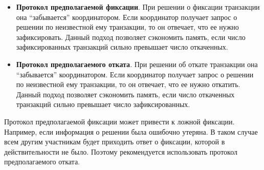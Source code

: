 \begin{itemize}
	\item \textbf{Протокол предполагаемой фиксации}. При решении о фиксации транзакции она
	      ``забывается'' координатором. Если координатор получает запрос о решении по неизвестной ему
	      транзакции, то он отвечает, что ее нужно зафиксировать. Данный подход позволяет сэкономить память,
	      если число зафиксированных транзакций сильно превышает число откаченных.
	\item \textbf{Протокол предполагаемого отката}. При решении об откате транзакции она
	      ``забывается'' координатором. Если координатор получает запрос о решении по неизвестной ему
	      транзакции, то он отвечает, что ее нужно откатить. Данный подход позволяет сэкономить память, если
	      число откаченных транзакций сильно превышает число зафиксированных.
\end{itemize}

\begin{remark}
	Протокол предполагаемой фиксации может привести к ложной фиксации. Например, если информация о
	решении была ошибочно утеряна. В таком случае всем другим участникам будет приходить ответ о
	фиксации, которой в действительности не было. Поэтому рекомендуется использовать протокол
	предполагаемого отката.
\end{remark}
